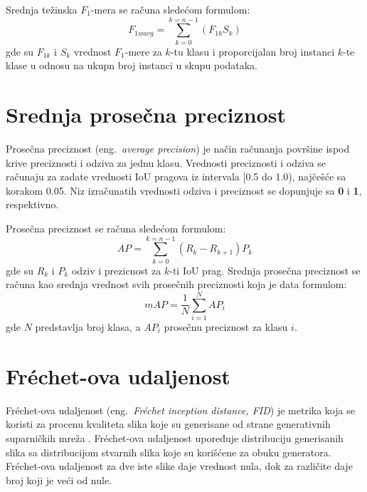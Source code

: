 \documentclass[12pt,oneside]{memoir}
\begin{document}
Srednja težinska $F_1$-mera se računa sledećom formulom:
\begin{equation}
\label{eq:f1wa}
    F_{1wavg} = \sum_{k=0}^{k=n-1} (F_{1k} S_{k})
\end{equation}
gde su \(F_{1k}\) i \(S_{k}\) vrednost $F_1$-mere za \(k\)-tu klasu i proporcijalan broj instanci \(k\)-te klase u odnosu na ukupn broj instanci u skupu podataka.

\section{Srednja prosečna preciznost}
\label{section4_avgprecision}

Prosečna preciznost (eng.~\textit{average precision}) je način računanja površine ispod krive preciznosti i odziva za jednu klasu. Vrednosti preciznosti i odziva se računaju za zadate vrednosti IoU pragova iz intervala [0.5 do 1.0), najčešće sa korakom 0.05.
Niz izračunatih vrednosti odziva i preciznost se dopunjuje sa \textbf{0} i \textbf{1}, respektivno. 

Prosečna preciznost se računa sledećom formulom:
\begin{equation}
\label{eq:ap}
    AP = \sum_{k=0}^{k=n-1} (R_{k} - R_{k+1})P_{k}
\end{equation}
gde su \(R_{k}\) i \(P_{k}\) odziv i prezicnost za \(k\)-ti IoU prag.
Srednja prosečna preciznost se računa kao srednja vrednost svih prosečnih preciznosti koja je data formulom:
\begin{equation}
\label{eq:map}
    mAP =\frac{1}{N} \sum_{i=1}^{N} AP_{i}
\end{equation}
gde \(N\) predstavlja broj klasa, a \(AP_{i}\) prosečnu preciznost za klasu 
\(i\).

\section{Fréchet-ova udaljenost}

Fréchet-ova udaljenost (eng.~\textit{Fréchet inception distance, FID}) je metrika koja se koristi za procenu kvaliteta slika koje su generisane od strane generativnih suparničkih mreža \cite{heusel2017gans}. Fréchet-ova udaljenost upoređuje distribuciju generisanih slika sa distribucijom stvarnih slika koje su korišćene za obuku generatora. Fréchet-ova udaljenost za dve iste slike daje vrednost nula, dok za različite daje broj koji je veći od nule.  
\end{document}
